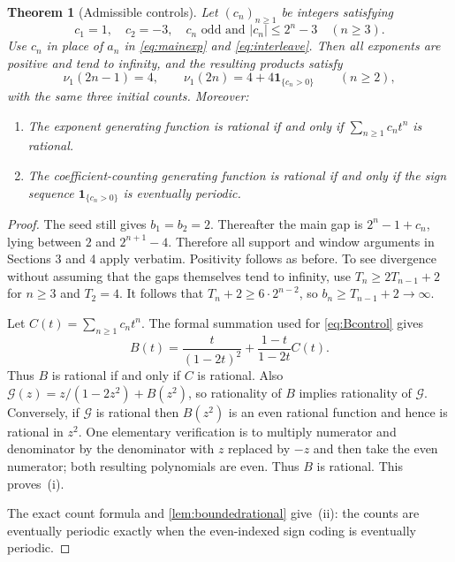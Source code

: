 \documentclass[11pt]{article}
\newtheorem{theorem}{Theorem}[section]
\theoremstyle{definition}\newtheorem{definition}[theorem]{Definition}
\theoremstyle{remark}\newtheorem{remark}[theorem]{Remark}
\newcommand{\ind}{\mathbf 1}
\newcommand{\nuone}{\nu_1}
\newcommand{\GF}{\mathcal G}
\begin{document}
\begin{theorem}[Admissible controls]\label{thm:coding}
Let $(c_n)_{n\geq1}$ be integers satisfying
\begin{equation}\label{eq:controlconditions}
 c_1=1,\quad c_2=-3,\quad
 c_n\text{ odd and }|c_n|\leq2^n-3\quad(n\geq3).
\end{equation}
Use $c_n$ in place of $a_n$ in \eqref{eq:mainexp} and \eqref{eq:interleave}. Then all exponents are positive and tend to infinity, and the resulting products satisfy
\[
 \nuone(2n-1)=4,\qquad
 \nuone(2n)=4+4\ind_{\{c_n>0\}}\qquad(n\geq2),
\]
with the same three initial counts. Moreover:
\begin{enumerate}[label=(\roman*)]
 \item The exponent generating function is rational if and only if $\sum_{n\geq1}c_nt^n$ is rational.
 \item The coefficient-counting generating function is rational if and only if the sign sequence $\ind_{\{c_n>0\}}$ is eventually periodic.
\end{enumerate}
\end{theorem}
\begin{proof}
The seed still gives $b_1=b_2=2$. Thereafter the main gap is $2^n-1+c_n$, lying between $2$ and $2^{n+1}-4$. Therefore all support and window arguments in Sections 3 and 4 apply verbatim. Positivity follows as before. To see divergence without assuming that the gaps themselves tend to infinity, use $T_n\geq2T_{n-1}+2$ for $n\geq3$ and $T_2=4$. It follows that $T_n+2\geq6\cdot2^{n-2}$, so $b_n\geq T_{n-1}+2\to\infty$.

Let $C(t)=\sum_{n\geq1}c_nt^n$. The formal summation used for \eqref{eq:Bcontrol} gives
\begin{equation}\label{eq:generalB}
 B(t)=\frac{t}{(1-2t)^2}+\frac{1-t}{1-2t}C(t).
\end{equation}
Thus $B$ is rational if and only if $C$ is rational. Also $\GF(z)=z/(1-2z^2)+B(z^2)$, so rationality of $B$ implies rationality of $\GF$. Conversely, if $\GF$ is rational then $B(z^2)$ is an even rational function and hence is rational in $z^2$. One elementary verification is to multiply numerator and denominator by the denominator with $z$ replaced by $-z$ and then take the even numerator; both resulting polynomials are even. Thus $B$ is rational. This proves~(i).

The exact count formula and \cref{lem:boundedrational} give~(ii): the counts are eventually periodic exactly when the even-indexed sign coding is eventually periodic.
\end{proof}
\end{document}
